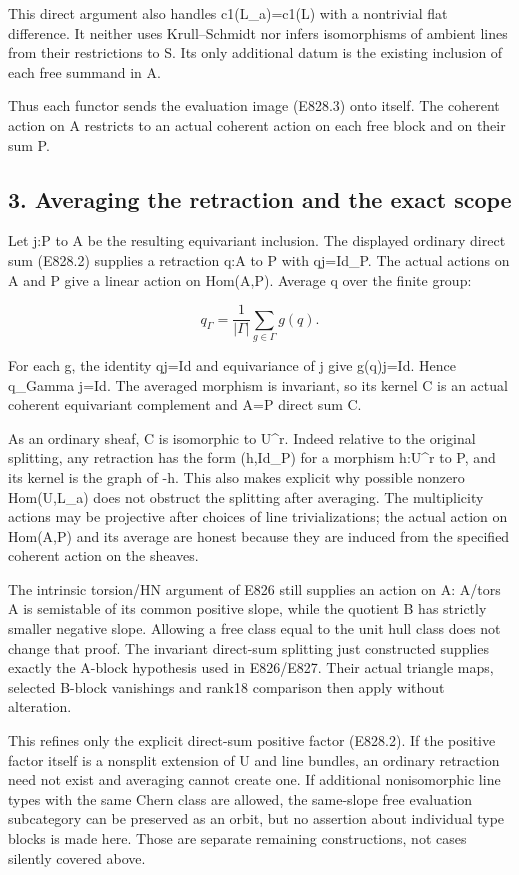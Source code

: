 This direct argument also handles c1(L\_a)=c1(L) with a nontrivial flat
difference. It neither uses Krull--Schmidt nor infers isomorphisms of
ambient lines from their restrictions to S. Its only additional datum is the
existing inclusion of each free summand in A.

Thus each functor sends the evaluation image (E828.3) onto itself. The
coherent action on A restricts to an actual coherent action on each free
block and on their sum P.

\subsection{3. Averaging the retraction and the exact
scope}\label{SF-E828:averaging-the-retraction-and-the-exact-scope}

Let j:P to A be the resulting equivariant inclusion. The displayed ordinary
direct sum (E828.2) supplies a retraction q:A to P with qj=Id\_P. The actual
actions on A and P give a linear action on Hom(A,P). Average q over the
finite group:

\[
 q_\Gamma=\frac1{|\Gamma|}\sum_{g\in\Gamma}g(q).
 \tag{E828.4}
\]

For each g, the identity qj=Id and equivariance of j give g(q)j=Id. Hence
q\_Gamma j=Id. The averaged morphism is invariant, so its kernel C is an
actual coherent equivariant complement and A=P direct sum C.

As an ordinary sheaf, C is isomorphic to U\^{}r. Indeed relative to the
original splitting, any retraction has the form (h,Id\_P) for a morphism
h:U\^{}r to P, and its kernel is the graph of -h. This also makes explicit
why possible nonzero Hom(U,L\_a) does not obstruct the splitting after
averaging. The multiplicity actions may be projective after choices of line
trivializations; the actual action on Hom(A,P) and its average are honest
because they are induced from the specified coherent action on the sheaves.

The intrinsic torsion/HN argument of E826 still supplies an action on A:
A/tors A is semistable of its common positive slope, while the quotient B
has strictly smaller negative slope. Allowing a free class equal to the unit
hull class does not change that proof. The invariant direct-sum splitting
just constructed supplies exactly the A-block hypothesis used in E826/E827.
Their actual triangle maps, selected B-block vanishings and rank18
comparison then apply without alteration.

This refines only the explicit direct-sum positive factor (E828.2). If the
positive factor itself is a nonsplit extension of U and line bundles, an
ordinary retraction need not exist and averaging cannot create one. If
additional nonisomorphic line types with the same Chern class are allowed,
the same-slope free evaluation subcategory can be preserved as an orbit, but
no assertion about individual type blocks is made here. Those are separate
remaining constructions, not cases silently covered above.

